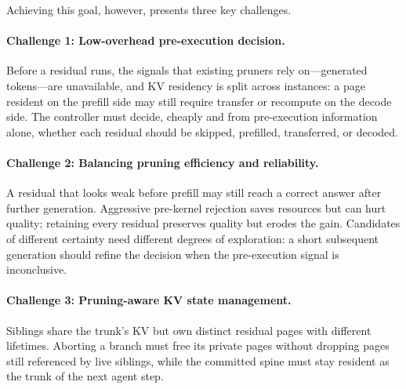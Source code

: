 Achieving this goal, however, presents three key challenges.

\paragraph{Challenge 1: Low-overhead pre-execution decision.}
Before a residual runs, the signals that existing pruners rely on---generated tokens---are unavailable, and KV residency is split across instances: a page resident on the prefill side may still require transfer or recompute on the decode side.
The controller must decide, cheaply and from pre-execution information alone, whether each residual should be skipped, prefilled, transferred, or decoded.

\paragraph{Challenge 2: Balancing pruning efficiency and reliability.}
A residual that looks weak before prefill may still reach a correct answer after further generation.
Aggressive pre-kernel rejection saves resources but can hurt quality; retaining every residual preserves quality but erodes the gain.
Candidates of different certainty need different degrees of exploration: a short subsequent generation should refine the decision when the pre-execution signal is inconclusive.

\paragraph{Challenge 3: Pruning-aware KV state management.}
Siblings share the trunk's KV but own distinct residual pages with different lifetimes.
Aborting a branch must free its private pages without dropping pages still referenced by live siblings, while the committed spine must stay resident as the trunk of the next agent step.

